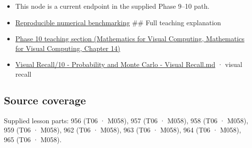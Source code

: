 \begin{itemize}
\item
  This node is a current endpoint in the supplied Phase 9--10 path.
\item
  \hyperref[appendix-b9db93e28371]{Reproducible numerical benchmarking} \#\# Full teaching explanation
\item
  \href{../02-Mathematics-for-Visual-Computing/main.pdf\#nameddest=02-foundations-ii-ch030-inference-and-error-metrics-need-explicit-assumptions}{Phase 10 teaching section (Mathematics for Visual Computing, Mathematics for Visual Computing, Chapter 14)}
\item
  \hyperref[appendix-cb5af353ef77]{Visual Recall/10 - Probability and Monte Carlo - Visual Recall.md} · visual recall
\end{itemize}

\subsection{Source coverage}\label{appendix-bcc44e9d3d02-source-coverage}

Supplied lesson parts: 956 (T06 · M058), 957 (T06 · M058), 958 (T06 · M058), 959 (T06 · M058), 962 (T06 · M058), 963 (T06 · M058), 964 (T06 · M058), 965 (T06 · M058).

